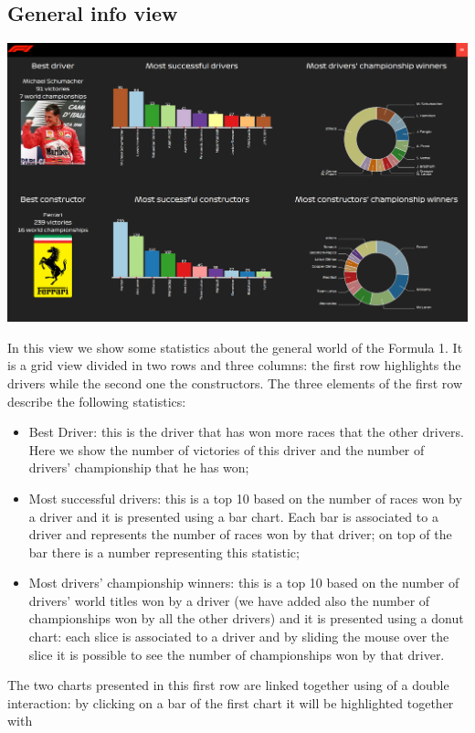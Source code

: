 \documentclass[11pt,twocolumn,letterpaper]{article}
\begin{document}
\subsection{General info view}
\begin{center}
	\centering
	\includegraphics[width=\columnwidth]{generalinfo}
\end{center}
In this view we show some statistics about the general world of the Formula 1. It is a grid view divided in two rows and three columns: the first row highlights the drivers
while the second one the constructors. The three elements of the first row describe the following statistics:
\begin{itemize}
	\item Best Driver: this is the driver that has won more races that the other drivers. Here we show the number of victories of this driver and the number of drivers'
	championship that he has won;
	\item Most successful drivers: this is a top 10 based on the number of races won by a driver and it is presented using a bar chart. Each bar is associated to a driver and
	represents the number of races won by that driver; on top of the bar there is a number representing this statistic;
	\item Most drivers' championship winners: this is a top 10 based on the number of drivers' world titles won by a driver (we have added also the number of championships
	won by all the other drivers) and it is presented using a donut chart: each slice is associated to a driver and by sliding the mouse over the slice it is possible to see the 
	number of championships won by that driver.
\end{itemize}
The two charts presented in this first row are linked together using of a double interaction: by clicking on a bar of the first chart it will be highlighted together with
\end{document}
